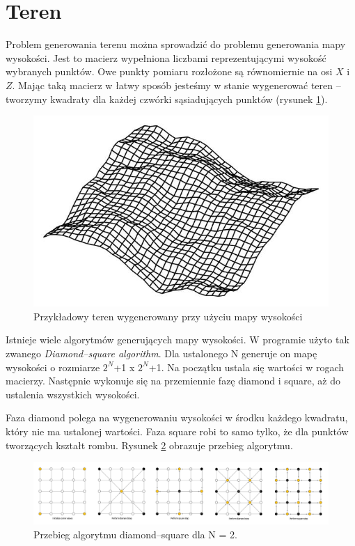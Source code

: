 \documentclass[inz,shortabstract]{iithesis}
\begin{document}
    \section{Teren}
        Problem generowania terenu można sprowadzić do problemu generowania mapy wysokości. Jest to macierz wypełniona liczbami reprezentującymi wysokość wybranych punktów. Owe punkty pomiaru rozłożone są równomiernie na osi $X$ i $Z$. Mając taką macierz w łatwy sposób jesteśmy w stanie wygenerować teren -- tworzymy kwadraty dla każdej czwórki sąsiadujących punktów (rysunek \ref{fig:heightmap}). 
        \begin{figure}[H]
            \includegraphics[width=\linewidth]{heightmap.png}
            \caption{Przykładowy teren wygenerowany przy użyciu mapy wysokości \cite{heightmap}} 
            \label{fig:heightmap}
        \end{figure}
        
        Istnieje wiele algorytmów generujących mapy wysokości. W programie użyto tak zwanego \textit{Diamond--square algorithm}. Dla ustalonego N generuje on mapę wysokości o rozmiarze $2^N$+1 x $2^N$+1. Na początku ustala się wartości w rogach macierzy. Następnie wykonuje się na przemiennie fazę diamond i square, aż do ustalenia wszystkich wysokości. 
        
        Faza diamond polega na wygenerowaniu wysokości w środku każdego kwadratu, który nie ma ustalonej wartości. Faza square robi to samo tylko, że dla punktów tworzących kształt rombu. Rysunek \ref{fig:diamondSquare} obrazuje przebieg algorytmu. 
        \begin{figure}[H]
            \includegraphics[width=\linewidth]{diamondSquare.png}
            \caption{Przebieg algorytmu diamond--square dla N = 2.} 
            \label{fig:diamondSquare}
        \end{figure}
        
\end{document}
